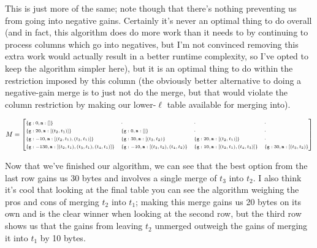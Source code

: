 \documentclass{article}[12]
\begin{document}
This is just more of the same; note though that there's nothing preventing us from going into negative gains. Certainly it's never an optimal thing to do overall (and in fact, this algorithm does do more work than it needs to by continuing to process columns which go into negatives, but I'm not convinced removing this extra work would actually result in a better runtime complexity, so I've opted to keep the algorithm simpler here), but it is an optimal thing to do within the restriction imposed by this column (the obviously better alternative to doing a negative-gain merge is to just not do the merge, but that would violate the column restriction by making our lower-$\ell$ table available for merging into).

\[ M = \fontsize{7}{8}\begin{bmatrix*}[l] 
\{ \texttt{g}: 0, \texttt{m}: []\} & \cdot & \cdot & \cdot\\
\{ \texttt{g}: 20, \texttt{m}: [(t_2, t_1)]\} & \{ \texttt{g}: 0, \texttt{m}: []\} & \cdot & \cdot\\
\{ \texttt{g}: -10, \texttt{m}: [(t_2, t_1), (t_3, t_1)]\} & \{ \texttt{g}: 30, \texttt{m}: [(t_3, t_2)\} & \{ \texttt{g}: 20, \texttt{m}: [(t_2, t_1)]\} & \cdot\\
\{ \texttt{g}: -130, \texttt{m}: [(t_2, t_1), (t_3, t_1), (t_4, t_1)]\} & \{ \texttt{g}: -10, \texttt{m}: [(t_3, t_2), (t_4, t_2)\} & \{ \texttt{g}: 10, \texttt{m}: [(t_2, t_1), (t_4, t_3)]\} & \{ \texttt{g}: 30, \texttt{m}: [(t_3, t_2)\} \\
\end{bmatrix*} \]

Now that we've finished our algorithm, we can see that the best option from the last row gains us 30 bytes and involves a single merge of $t_3$ into $t_2$. I also think it's cool that looking at the final table you can see the algorithm weighing the pros and cons of merging $t_2$ into $t_1$; making this merge gains us 20 bytes on its own and is the clear winner when looking at the second row, but the third row shows us that the gains from leaving $t_2$ unmerged outweigh the gains of merging it into $t_1$ by 10 bytes.
\end{document}
